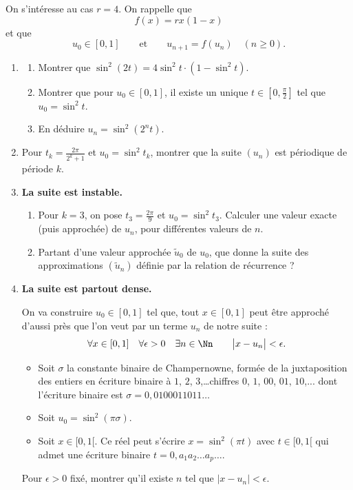 \documentclass[class=report,crop=false]{standalone}
\begin{document}
\begin{tp}
On s'intéresse au cas $r=4$. On rappelle que 
$$f(x)=rx(1-x)$$
et que 
$$u_0 \in [0,1] \qquad \mbox{et} \qquad u_{n+1} = f(u_n)\quad (n\geq 0).$$

\begin{enumerate}
  \item 
  \begin{enumerate}
    \item Montrer que $\sin^2(2t) = 4 \sin^2 t \cdot (1-\sin^2 t)$.
    \item Montrer que pour $u_0 \in [0,1]$, il existe un unique $t \in [0,\frac\pi2]$ tel que
    $u_0 = \sin^2 t$.
    \item En déduire $u_n = \sin^2(2^n t)$.
  \end{enumerate}
  
  \item Pour $t_k = \frac{2\pi}{2^k+1}$ et $u_0 = \sin^2 t_k$, 
  montrer que la suite $(u_n)$ est périodique de période $k$.
  
  \item \textbf{La suite est instable.}
  \begin{enumerate}
    \item Pour $k=3$, on pose $t_3 = \frac{2\pi}{9}$ et $u_0 = \sin^2 t_3$.
    Calculer une valeur exacte (puis approchée) de $u_n$, pour différentes valeurs de $n$.
    
    \item Partant d'une valeur approchée $\tilde{u}_0$ de $u_0$, 
    que donne la suite des approximations $(\tilde{u}_n)$ définie 
    par la relation de récurrence ?
  \end{enumerate}
  
    
  \item \textbf{La suite est partout dense.}
  
  On va construire $u_0\in[0,1]$ tel que, tout $x\in[0,1]$ peut être approché d'aussi près que l'on veut par 
  un terme $u_n$ de notre suite :
  $$\forall x \in [0,1] \quad \forall \epsilon > 0 \quad \exists n \in \Nn \qquad \big| x -u_n \big| < \epsilon.$$
  
  
  \begin{itemize}
    \item Soit $\sigma$ la constante binaire de Champernowne, 
    formée de la juxtaposition des entiers en écriture binaire 
    à $1$, $2$, $3$,\ldots chiffres $0$, $1$, $00$, $01$, $10$,...
    dont l'écriture binaire est $\sigma = 0,0100011011\ldots$
    
    \item Soit $u_0 = \sin^2 (\pi\sigma)$. 
    
    \item Soit $x \in [0,1[$. Ce réel peut s'écrire $x = \sin^2(\pi t)$ avec 
    $t\in [0,1[$ qui admet une écriture binaire $t= 0,a_1 a_2 \ldots a_p \ldots$.
  \end{itemize}
  
  Pour $\epsilon>0$ fixé, montrer qu'il existe $n$ tel que $\big| x -u_n \big| < \epsilon$.
  
\end{enumerate}

\end{tp}
\end{document}
